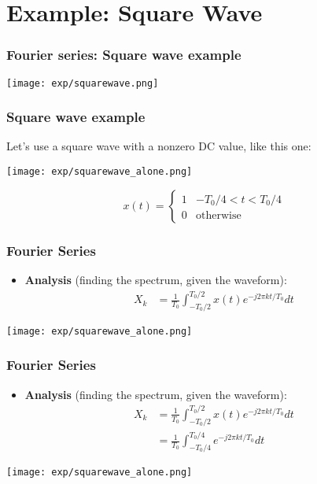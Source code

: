 \documentclass{beamer}
\begin{document}
\section[Square Wave]{Example: Square Wave}
\setcounter{subsection}{1}

\begin{frame}
  \frametitle{Fourier series: Square wave example}
  \centerline{\texttt{[image: exp/squarewave.png]}}
\end{frame}

\begin{frame}
  \frametitle{Square wave example}
  Let's use a square wave with a nonzero DC value, like this one:
  \centerline{\texttt{[image: exp/squarewave\_alone.png]}}
  \[
  x(t) = \left\{\begin{array}{ll}
  1 & -T_0/4 < t < T_0/4 \\
  0 & \mbox{otherwise}
  \end{array}\right.
  \]
\end{frame}

\begin{frame}
  \frametitle{Fourier Series}

  \begin{itemize}
  \item {\bf Analysis}  (finding the spectrum, given the waveform):
    \begin{align*}
    X_k &= \frac{1}{T_0}\int_{-T_0/2}^{T_0/2} x(t)e^{-j2\pi kt/T_0}dt
    \end{align*}
  \end{itemize}
  \centerline{\texttt{[image: exp/squarewave\_alone.png]}}
  
\end{frame}

\begin{frame}
  \frametitle{Fourier Series}

  \begin{itemize}
  \item {\bf Analysis}  (finding the spectrum, given the waveform):
    \begin{align*}
    X_k &= \frac{1}{T_0}\int_{-T_0/2}^{T_0/2} x(t)e^{-j2\pi kt/T_0}dt\\
    &= \frac{1}{T_0}\int_{-T_0/4}^{T_0/4} e^{-j2\pi kt/T_0}dt
    \end{align*}
  \end{itemize}
  \centerline{\texttt{[image: exp/squarewave\_alone.png]}}
  
\end{frame}
\end{document}
